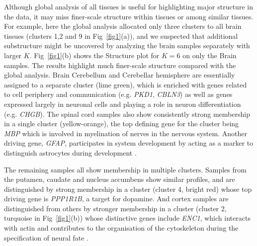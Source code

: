 \documentclass[10pt,letterpaper]{article}
\begin{document}
%

Although global analysis of all tissues is useful for highlighting major structure in the data, it may miss finer-scale structure within tissues or among similar tissues. For example, here the global analysis allocated only three clusters to all brain tissues (clusters 1,2 and 9 in Fig~\ref{fig1}(a)), and we suspected that additional substructure might be uncovered by analyzing the brain samples separately with larger $K$.  Fig~\ref{fig1}(b) shows the Structure plot for $K=6$ on only the Brain samples. The results highlight much finer-scale structure compared with the global analysis. Brain Cerebellum and Cerebellar hemisphere are essentially assigned to a separate cluster (lime green), which is enriched with genes related to cell periphery and communication (e.g. \textit{PKD1}, \textit{CBLN3}) as well as genes expressed largely in neuronal cells and playing a role in neuron differentiation (e.g. \textit{CHGB}). The spinal cord samples also show consistently strong membership in a single cluster (yellow-orange), the top defining gene for the cluster being \textit{MBP} which is involved in myelination of nerves in the nervous system\cite{Hu2016}.  Another driving gene, \textit{GFAP}, participates in system development by acting as a marker to distinguish astrocytes during development \cite{Baba1997}.

The remaining samples all show membership in multiple clusters. Samples from the putamen, caudate and nucleus accumbens show similar profiles, and are distinguished by strong membership in a cluster (cluster 4, bright red) whose top driving gene is \textit{PPP1R1B}, a target for dopamine. And cortex samples are distinguished from others by stronger membership in a cluster (cluster 2, turquoise in Fig~\ref{fig1}(b)) whose distinctive genes include \textit{ENC1}, which interacts with actin and contributes to the organisation of the cytoskeleton during the specification of neural fate \cite{Hernandez1997}.
\end{document}
